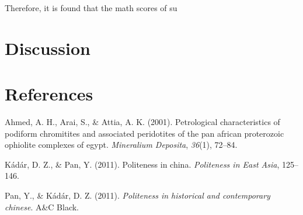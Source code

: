 \documentclass[man, fleqn, noextraspace]{apa6}
\begin{document}
Therefore, it is found that the math scores of su

\section{\texorpdfstring{\textbf{Discussion}}{Discussion}}\label{discussion}

\newpage

\section{\texorpdfstring{\textbf{References}}{References}}\label{references}

\begingroup
\setlength{\parindent}{-0.5in} \setlength{\leftskip}{0.5in}

\hypertarget{refs}{}
\hypertarget{ref-ahmed2001}{}
Ahmed, A. H., Arai, S., \& Attia, A. K. (2001). Petrological
characteristics of podiform chromitites and associated peridotites of
the pan african proterozoic ophiolite complexes of egypt.
\emph{Mineralium Deposita}, \emph{36}(1), 72--84.

\hypertarget{ref-kadar2011}{}
Kádár, D. Z., \& Pan, Y. (2011). Politeness in china. \emph{Politeness
in East Asia}, 125--146.

\hypertarget{ref-pan2011}{}
Pan, Y., \& Kádár, D. Z. (2011). \emph{Politeness in historical and
contemporary chinese}. A\&C Black.

\endgroup
\end{document}
